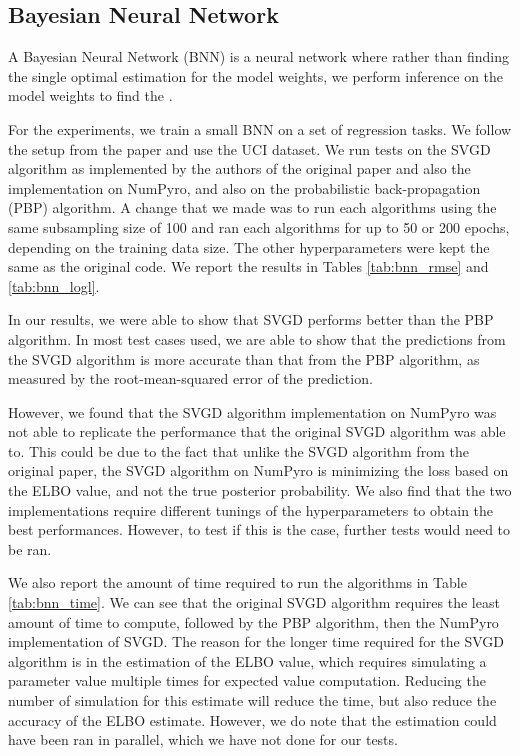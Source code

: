 \subsection{Bayesian Neural Network}

A Bayesian Neural Network (BNN) is a neural network where rather than finding the single optimal estimation for the model weights, we perform inference on the model weights to find the .

For the experiments, we train a small BNN on a set of regression tasks. We follow the setup from the paper and use the UCI dataset. We run tests on the SVGD algorithm as implemented by the authors of the original paper and also the implementation on NumPyro, and also on the probabilistic back-propagation (PBP) algorithm. A change that we made was to run each algorithms using the same subsampling size of 100 and ran each algorithms for up to 50 or 200 epochs, depending on the training data size. The other hyperparameters were kept the same as the original code. We report the results in Tables \ref{tab:bnn_rmse} and \ref{tab:bnn_logl}. 



In our results, we were able to show that SVGD performs better than the PBP algorithm. In most test cases used, we are able to show that the predictions from the SVGD algorithm is more accurate than that from the PBP algorithm, as measured by the root-mean-squared error of the prediction. 

However, we found that the SVGD algorithm implementation on NumPyro was not able to replicate the performance that the original SVGD algorithm was able to. This could be due to the fact that unlike the SVGD algorithm from the original paper, the SVGD algorithm on NumPyro is minimizing the loss based on the ELBO value, and not the true posterior probability. We also find that the two implementations require different tunings of the hyperparameters to obtain the best performances. However, to test if this is the case, further tests would need to be ran.

We also report the amount of time required to run the algorithms in Table \ref{tab:bnn_time}. We can see that the original SVGD algorithm requires the least amount of time to compute, followed by the PBP algorithm, then the NumPyro implementation of SVGD. The reason for the longer time required for the SVGD algorithm is in the estimation of the ELBO value, which requires simulating a parameter value multiple times for expected value computation. Reducing the number of simulation for this estimate will reduce the time, but also reduce the accuracy of the ELBO estimate. However, we do note that the estimation could have been ran in parallel, which we have not done for our tests.

